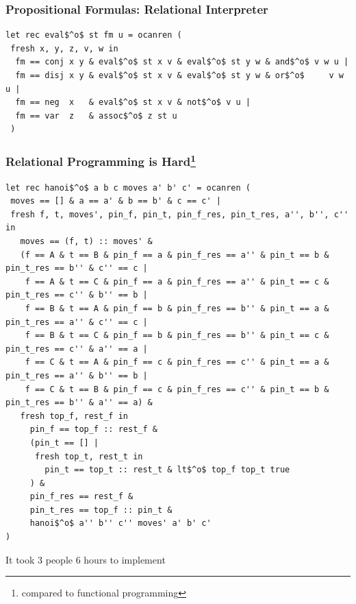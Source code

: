 \documentclass[xcolor=table]{beamer}
\begin{document}
\begin{frame}[fragile]
  \transwipe[direction=90]
  \frametitle{Propositional Formulas: Relational Interpreter}

\begin{lstlisting}
let rec eval$^o$ st fm u = ocanren (
 fresh x, y, z, v, w in
  fm == conj x y & eval$^o$ st x v & eval$^o$ st y w & and$^o$ v w u |
  fm == disj x y & eval$^o$ st x v & eval$^o$ st y w & or$^o$     v w u |
  fm == neg  x   & eval$^o$ st x v & not$^o$ v u |
  fm == var  z   & assoc$^o$ z st u
 )
\end{lstlisting}

\end{frame}

\begin{frame}[fragile]
  \transwipe[direction=90]
  \frametitle{Relational Programming is Hard\footnote{compared to functional programming}}
\begin{lstlisting}[basicstyle=\tiny]
let rec hanoi$^o$ a b c moves a' b' c' = ocanren (
 moves == [] & a == a' & b == b' & c == c' |
 fresh f, t, moves', pin_f, pin_t, pin_f_res, pin_t_res, a'', b'', c'' in
   moves == (f, t) :: moves' &
   (f == A & t == B & pin_f == a & pin_f_res == a'' & pin_t == b & pin_t_res == b'' & c'' == c |
    f == A & t == C & pin_f == a & pin_f_res == a'' & pin_t == c & pin_t_res == c'' & b'' == b |
    f == B & t == A & pin_f == b & pin_f_res == b'' & pin_t == a & pin_t_res == a'' & c'' == c |
    f == B & t == C & pin_f == b & pin_f_res == b'' & pin_t == c & pin_t_res == c'' & a'' == a |
    f == C & t == A & pin_f == c & pin_f_res == c'' & pin_t == a & pin_t_res == a'' & b'' == b |
    f == C & t == B & pin_f == c & pin_f_res == c'' & pin_t == b & pin_t_res == b'' & a'' == a) &
   fresh top_f, rest_f in
     pin_f == top_f :: rest_f &
     (pin_t == [] |
      fresh top_t, rest_t in
        pin_t == top_t :: rest_t & lt$^o$ top_f top_t true
     ) &
     pin_f_res == rest_f &
     pin_t_res == top_f :: pin_t &
     hanoi$^o$ a'' b'' c'' moves' a' b' c'
)
\end{lstlisting}

\pause

\begin{center} It took 3 people 6 hours to implement  \end{center}
\end{frame}
\end{document}
